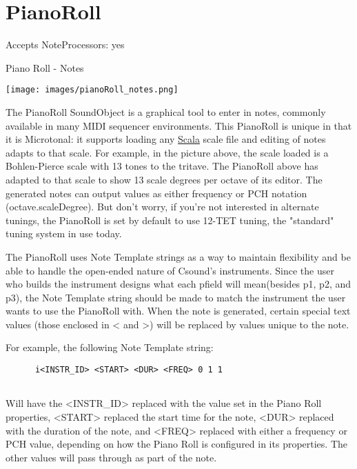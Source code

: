 \section{PianoRoll}\label{pianoRoll}

Accepts NoteProcessors: yes

Piano Roll - Notes

\texttt{[image: images/pianoRoll\_notes.png]}

The PianoRoll SoundObject is a graphical tool to enter in notes,
commonly available in many MIDI sequencer environments. This PianoRoll
is unique in that it is Microtonal: it supports loading any
\href{http://www.huygens-fokker.org/scala/}{Scala} scale file and
editing of notes adapts to that scale. For example, in the picture
above, the scale loaded is a Bohlen-Pierce scale with 13 tones to the
tritave. The PianoRoll above has adapted to that scale to show 13 scale
degrees per octave of its editor. The generated notes can output values
as either frequency or PCH notation (octave.scaleDegree). But don't
worry, if you're not interested in alternate tunings, the PianoRoll is
set by default to use 12-TET tuning, the "standard" tuning system in use
today.

The PianoRoll uses Note Template strings as a way to maintain
flexibility and be able to handle the open-ended nature of Csound's
instruments. Since the user who builds the instrument designs what each
pfield will mean(besides p1, p2, and p3), the Note Template string
should be made to match the instrument the user wants to use the
PianoRoll with. When the note is generated, certain special text values
(those enclosed in \textless{} and \textgreater{}) will be replaced by
values unique to the note.

For example, the following Note Template string:

\begin{verbatim}
      i<INSTR_ID> <START> <DUR> <FREQ> 0 1 1
    
\end{verbatim}

Will have the \textless{}INSTR\_ID\textgreater{} replaced with the value
set in the Piano Roll properties, \textless{}START\textgreater{}
replaced the start time for the note, \textless{}DUR\textgreater{}
replaced with the duration of the note, and
\textless{}FREQ\textgreater{} replaced with either a frequency or PCH
value, depending on how the Piano Roll is configured in its properties.
The other values will pass through as part of the note.

